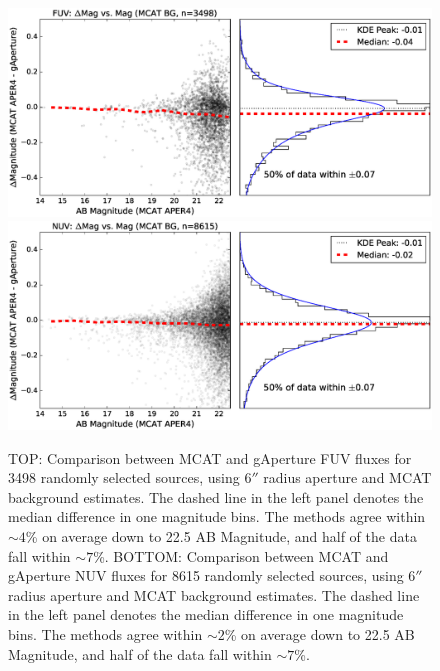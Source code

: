 \documentclass[preprint]{aastex}
\begin{document}
\begin{figure}[t!]
\begin{minipage}[c][11cm][c]{1.\textwidth}
\centering
\includegraphics[scale=0.64]{Fig06a.eps}
\includegraphics[scale=0.64]{Fig06b.eps}
\caption{TOP: Comparison between MCAT and gAperture FUV fluxes for 3498 randomly selected sources, using $6''$ radius aperture and MCAT background estimates. The dashed line in the left panel denotes the median difference in one magnitude bins. The methods agree within $\sim 4$\% on average down to 22.5 AB Magnitude, and half of the data fall within $\sim 7$\%.  BOTTOM: Comparison between MCAT and gAperture NUV fluxes for 8615 randomly selected sources, using $6''$ radius aperture and MCAT background estimates. The dashed line in the left panel denotes the median difference in one magnitude bins. The methods agree within $\sim 2$\% on average down to 22.5 AB Magnitude, and half of the data fall within $\sim 7$\%.
\label{fuvnuvrelphotmcat}}
\end{minipage}
\end{figure}
\end{document}
